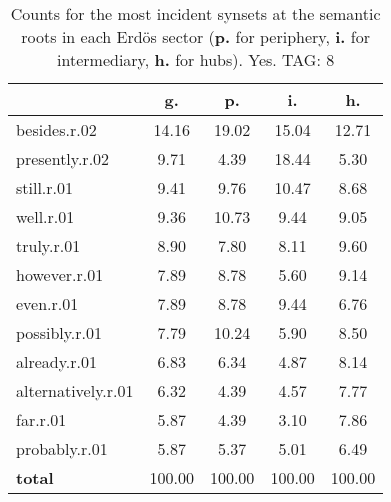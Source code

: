 \begin{table}[h!]
\begin{center}
\begin{tabular}{| l | c | c | c | c |}\hline
 & g. & p. & i. & h. \\\hline
besides.r.02 & 14.16  & 19.02  & 15.04  & 12.71 \\\hline
presently.r.02 & 9.71  & 4.39  & 18.44  & 5.30 \\\hline
still.r.01 & 9.41  & 9.76  & 10.47  & 8.68 \\\hline
well.r.01 & 9.36  & 10.73  & 9.44  & 9.05 \\\hline
truly.r.01 & 8.90  & 7.80  & 8.11  & 9.60 \\\hline
however.r.01 & 7.89  & 8.78  & 5.60  & 9.14 \\\hline
even.r.01 & 7.89  & 8.78  & 9.44  & 6.76 \\\hline
possibly.r.01 & 7.79  & 10.24  & 5.90  & 8.50 \\\hline
already.r.01 & 6.83  & 6.34  & 4.87  & 8.14 \\\hline
alternatively.r.01 & 6.32  & 4.39  & 4.57  & 7.77 \\\hline
far.r.01 & 5.87  & 4.39  & 3.10  & 7.86 \\\hline
probably.r.01 & 5.87  & 5.37  & 5.01  & 6.49 \\\hline
{{\bf total}} & 100.00  & 100.00  & 100.00  & 100.00 \\\hline
\end{tabular}
\caption{Counts for the most incident synsets at the semantic roots in each Erd\"os sector ({\bf p.} for periphery, {\bf i.} for intermediary, {\bf h.} for hubs). Yes. TAG: 8}
\end{center}
\end{table}